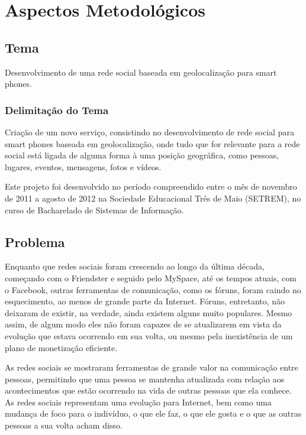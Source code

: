 \documentclass[diss]{template/setrem}
\begin{document}
\chapter{Aspectos Metodológicos}
\label{chapter:aspectosmetodologicos}

\section{Tema}
Desenvolvimento de uma rede social baseada em geolocalização para smart phones.
	
\subsection{Delimitação do Tema}
Criação de um novo serviço, consistindo no desenvolvimento de rede social para smart phones baseada em geolocalização, onde tudo que for relevante para a rede social está ligada de alguma forma à uma posição geográfica, como pessoas, lugares, eventos, mensagens, fotos e vídeos.

Este projeto foi desenvolvido no período compreendido entre o mês de novembro de 2011 a agosto de 2012 na Sociedade Educacional Três de Maio (SETREM), no curso de Bacharelado de Sistemas de Informação.

\section{Problema}
Enquanto que redes sociais foram crescendo ao longo da última década, começando com o Friendster e seguido pelo MySpace, até os tempos atuais, com o Facebook, outras ferramentas de comunicação, como os fóruns, foram caindo no esquecimento, ao menos de grande parte da Internet. Fóruns, entretanto, não deixaram de existir, na verdade, ainda existem alguns muito populares. Mesmo assim, de algum modo eles não foram capazes de se atualizarem em vista da evolução que estava ocorrendo em sua volta, ou mesmo pela inexistência de um plano de monetização eficiente.

As redes sociais se mostraram ferramentas de grande valor na comunicação entre pessoas, permitindo que uma pessoa se mantenha atualizada com relação aos acontecimentos que estão ocorrendo na vida de outras pessoas que ela conhece. As redes sociais representam uma evolução para Internet, bem como uma mudança de foco para o indivíduo, o que ele faz, o que ele gosta e o que as outras pessoas a sua volta acham disso.
\end{document}
